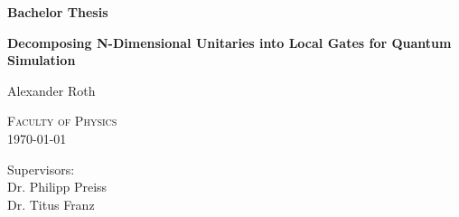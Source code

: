 \begin{titlepage}
    \centering
    
    \begin{minipage}{0.5\textwidth}
    \end{minipage}
    \hfill
    \begin{minipage}{0.3\textwidth}
    \end{minipage}

    
    \vspace{2cm}

    {\Large \bfseries Bachelor Thesis}

    \vspace{0.5cm}
    
    {\huge\bfseries Decomposing N-Dimensional Unitaries into Local Gates for Quantum Simulation \\[0.4cm]}
    
    \vspace{1.5cm}
    
    {\Large Alexander Roth}
    
    
    \vfill
    

    \vfill
    \textsc{Faculty of Physics}\\
    \vspace{1cm}
    {\Large \today}
    \vfill

    \Large Supervisors: \\Dr. Philipp Preiss \\Dr. Titus Franz
    
\end{titlepage}